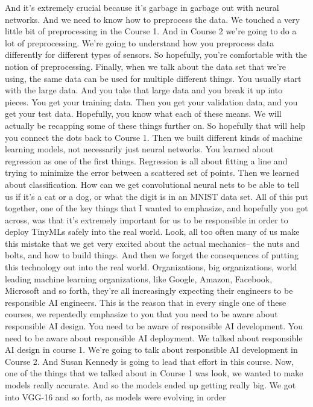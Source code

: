 And it's extremely crucial because it's garbage
in garbage out with neural networks.
And we need to know how to preprocess the data.
We touched a very little bit of preprocessing in the Course 1.
And in Course 2 we're going to do a lot of preprocessing.
We're going to understand how you preprocess data differently
for different types of sensors.
So hopefully, you're comfortable with the notion of preprocessing.
Finally, when we talk about the data set that we're using,
the same data can be used for multiple different things.
You usually start with the large data.
And you take that large data and you break it up into pieces.
You get your training data.
Then you get your validation data, and you get your test data.
Hopefully, you know what each of these means.
We will actually be recapping some of these things further on.
So hopefully that will help you connect the dots back to Course 1.
Then we built different kinds of machine learning models, not necessarily just
neural networks.
You learned about regression as one of the first things.
Regression is all about fitting a line and trying
to minimize the error between a scattered set of points.
Then we learned about classification.
How can we get convolutional neural nets to be
able to tell us if it's a cat or a dog, or what
the digit is in an MNIST data set.
All of this put together, one of the key things that I wanted to emphasize,
and hopefully you got across, was that it's extremely important for us
to be responsible in order to deploy TinyMLs safely into the real world.
Look, all too often many of us make this mistake
that we get very excited about the actual mechanics-- the nuts and bolts,
and how to build things.
And then we forget the consequences of putting this technology out
into the real world.
Organizations, big organizations, world leading machine learning organizations,
like Google, Amazon, Facebook, Microsoft and so forth, they're all increasingly
expecting their engineers to be responsible AI engineers.
This is the reason that in every single one of these courses,
we repeatedly emphasize to you that you need to be aware about responsible AI
design.
You need to be aware of responsible AI development.
You need to be aware about responsible AI deployment.
We talked about responsible AI design in course 1.
We're going to talk about responsible AI development in Course 2.
And Susan Kennedy is going to lead that effort in this course.
Now, one of the things that we talked about in Course 1 was look,
we wanted to make models really accurate.
And so the models ended up getting really big.
We got into VGG-16 and so forth, as models were evolving in order
